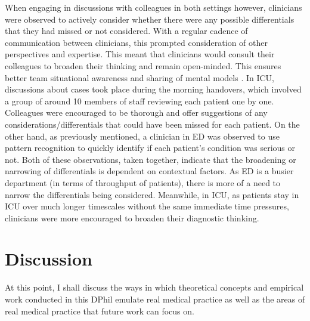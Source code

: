 \documentclass[a4paper, nobind]{templates/ociamthesis}
\begin{document}
\hfill\break
When engaging in discussions with colleagues in both settings however, clinicians were observed to actively consider whether there were any possible differentials that they had missed or not considered. With a regular cadence of communication between clinicians, this prompted consideration of other perspectives and expertise. This meant that clinicians would consult their colleagues to broaden their thinking and remain open-minded. This ensures better team situational awareness \autocite{salas_situation_1995} and sharing of mental models \autocite{alby_diagnostic_2015}. In ICU, discussions about cases took place during the morning handovers, which involved a group of around 10 members of staff reviewing each patient one by one. Colleagues were encouraged to be thorough and offer suggestions of any considerations/differentials that could have been missed for each patient. On the other hand, as previously mentioned, a clinician in ED was observed to use pattern recognition to quickly identify if each patient's condition was serious or not. Both of these observations, taken together, indicate that the broadening or narrowing of differentials is dependent on contextual factors. As ED is a busier department (in terms of throughput of patients), there is more of a need to narrow the differentials being considered. Meanwhile, in ICU, as patients stay in ICU over much longer timescales without the same immediate time pressures, clinicians were more encouraged to broaden their diagnostic thinking.

\section{Discussion}\label{discussion-4}

At this point, I shall discuss the ways in which theoretical concepts and empirical work conducted in this DPhil emulate real medical practice as well as the areas of real medical practice that future work can focus on.
\end{document}
